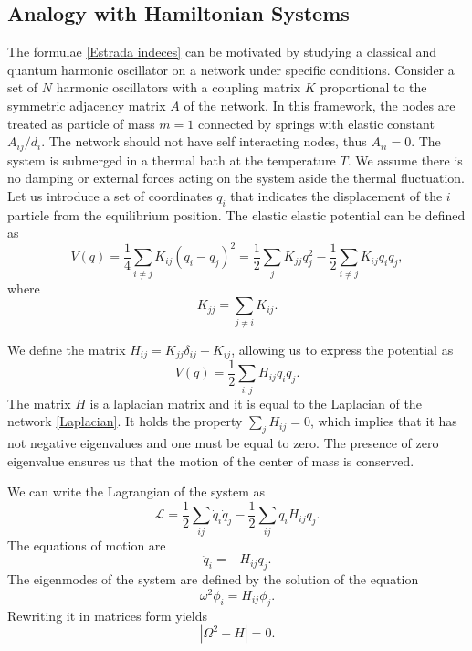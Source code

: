 
\subsection{Analogy with Hamiltonian Systems}
The formulae \eqref{Estrada indeces} can be motivated by studying a classical and quantum harmonic oscillator on a network under specific conditions.
Consider a set of $N$ harmonic oscillators with a coupling matrix $K$ proportional to the symmetric adjacency matrix $A$ of the network. In this framework, the nodes are treated as particle of mass $m = 1$ connected by springs with elastic constant $A_{ij}/d_i$. The network should not have self interacting nodes, thus $A_{ii} = 0$. The system is submerged in a thermal bath at the temperature $T$. We assume there is no damping or external forces acting on the system aside the thermal fluctuation. 
Let us introduce a set of coordinates $q_i$ that indicates the displacement of the $i$ particle from the equilibrium position. The elastic elastic potential can be defined as
\begin{equation}
    V(q) = \frac{1}{4}\sum_{i\neq j} K_{ij}(q_i-q_j)^2 = \frac{1}{2}\sum_{j}K_{jj}q_j^2 - \frac{1}{2} \sum_{i\neq j}K_{ij}q_iq_j,
\end{equation}
where 
\begin{equation}
    K_{jj} = \sum_{j \neq i} K_{ij}.
\end{equation}

We define the matrix $H_{ij}= K_{jj}\delta_{ij} - K_{ij}$, allowing us to express the potential as
\begin{equation}
    V(q) = \frac{1}{2}\sum_{i,j} H_{ij} q_i q_j.
\end{equation}
The matrix $H$ is a laplacian matrix and it is equal to the Laplacian of the network \eqref{Laplacian}. It holds the property $\sum_j H_{ij} = 0$, which implies that it has not negative eigenvalues and one must be equal to zero.
The presence of zero eigenvalue ensures us that the motion of the center of mass is conserved. %

We can write the Lagrangian of the system as
\begin{equation}
    \mathcal{L} = \frac{1}{2}\sum_{ij} \dot q_i \dot q_j - \frac{1}{2} \sum_{ij} q_iH_{ij}q_j.
\end{equation}
The equations of motion are
\begin{equation}
    \ddot q_i = -H_{ij} q_j.
\end{equation}
The eigenmodes of the system are defined by the solution of the equation 
\begin{equation}
    \omega^2 \phi_i = H_{ij} \phi_j.
\end{equation}
Rewriting it in matrices form yields
\begin{equation}
    |\Omega^2 - H| = 0. %
\end{equation}

